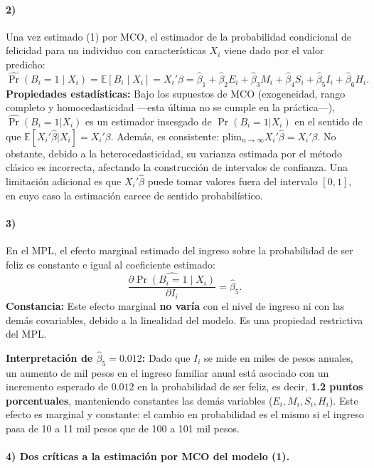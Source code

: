 \documentclass[12pt]{article}
\begin{document}
\paragraph{2)} 
Una vez estimado (1) por MCO, el estimador de la probabilidad condicional de felicidad para un individuo con características \(X_i\) viene dado por el valor predicho:
\[
\widehat{\Pr}(B_i=1 \mid X_i) = \mathbb{E}[B_i \mid X_i] = X_i'\hat{\beta} = \hat{\beta}_1 + \hat{\beta}_2 E_i + \hat{\beta}_3 M_i + \hat{\beta}_4 S_i + \hat{\beta}_5 I_i + \hat{\beta}_6 H_i.
\]
\noindent \textbf{Propiedades estadísticas:} Bajo los supuestos de MCO (exogeneidad, rango completo y homocedasticidad —esta última no se cumple en la práctica—), \(\widehat{\Pr}(B_i=1|X_i)\) es un estimador insesgado de \(\Pr(B_i=1|X_i)\) en el sentido de que \(\mathbb{E}[X_i'\hat{\beta}|X_i] = X_i'\beta\). Además, es consistente: plim\(_{n\to\infty} X_i'\hat{\beta} = X_i'\beta\). No obstante, debido a la heterocedasticidad, su varianza estimada por el método clásico es incorrecta, afectando la construcción de intervalos de confianza. Una limitación adicional es que \(X_i'\hat{\beta}\) puede tomar valores fuera del intervalo \([0,1]\), en cuyo caso la estimación carece de sentido probabilístico.

\paragraph{3)} 
En el MPL, el efecto marginal estimado del ingreso sobre la probabilidad de ser feliz es constante e igual al coeficiente estimado:
\[
\widehat{\frac{\partial \Pr(B_i=1 \mid X_i)}{\partial I_i}} = \hat{\beta}_5.
\]
\noindent \textbf{Constancia:} Este efecto marginal \textbf{no varía} con el nivel de ingreso ni con las demás covariables, debido a la linealidad del modelo. Es una propiedad restrictiva del MPL.

\noindent \textbf{Interpretación de \(\hat{\beta}_5 = 0.012\):} Dado que \(I_i\) se mide en miles de pesos anuales, un aumento de mil pesos en el ingreso familiar anual está asociado con un incremento esperado de \(0.012\) en la probabilidad de ser feliz, es decir, \textbf{1.2 puntos porcentuales}, manteniendo constantes las demás variables (\(E_i, M_i, S_i, H_i\)). Este efecto es marginal y constante: el cambio en probabilidad es el mismo si el ingreso pasa de 10 a 11 mil pesos que de 100 a 101 mil pesos.

\paragraph{4) Dos críticas a la estimación por MCO del modelo (1).}
\end{document}
